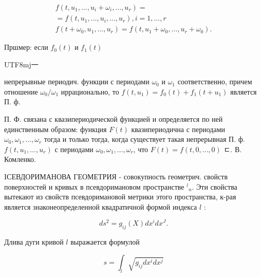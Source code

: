 \documentclass[10pt]{article}
\begin{document}
\[

\begin{gathered}

f\left(t, u_{1}, \ldots, u_{i}+\omega_{i}, \ldots, u_{r}\right)= \\

=f\left(t, u_{1}, \ldots, u_{i}, \ldots, u_{r}\right), i=1, \ldots, r \\

f\left(t+\omega_{0}, u_{1}, \ldots, u_{r}\right)=f\left(t, u_{1}+\omega_{0}, \ldots, u_{r}+\omega_{0}\right) .

\end{gathered}

\]



Пршмер: если $f_{0}(t)$ и $f_{1}(t)$ \begin{CJK}{UTF8}{mj}一\end{CJK}непрерывные периодич. функции с периодами $\omega_{0}$ и $\omega_{1}$ соответственно, причем отношение $\omega_{0} / \omega_{1}$ иррационально, то $f\left(t, u_{1}\right)=f_{0}(t)+f_{1}\left(t+u_{1}\right)$ является П. ф.



П. Ф. связана с квазипериодической функцией и определяется по ней единственным образом: функция $F(t)$ квазипериодична с периодами $\omega_{0}, \omega_{1}, \ldots, \omega_{r}$ тогда и только тогда, когда существует такая непрерывная П. ф. $f\left(t, u_{1}, \ldots, u_{r}\right)$ с периодами $\omega_{0}, \omega_{1}, \ldots, \omega_{r}$, что $F(t)=f(t, 0, \ldots, 0)$ ㄷ. В. Комленко.



IСЕВДОРИМАНОВА ГЕОМЕТРИЯ - совокупность геометрич. свойств поверхностей и кривых в псевдоримановом пространстве ${ }^{l}{ }_{n}$. Эти свойства вытекают из свойств псевдоримановой метрики этого пространства, к-рая является знаконеопределенной квадратичной формой индекса $l$ :



\[

d s^{2}=g_{i j}(X) d x^{i} d x^{J} .

\]



Длива дуги кривой $l$ выражается формулой



\[

s=\int_{l} \sqrt{g_{i j} d x^{i} d x^{j}}

\]
\end{document}
